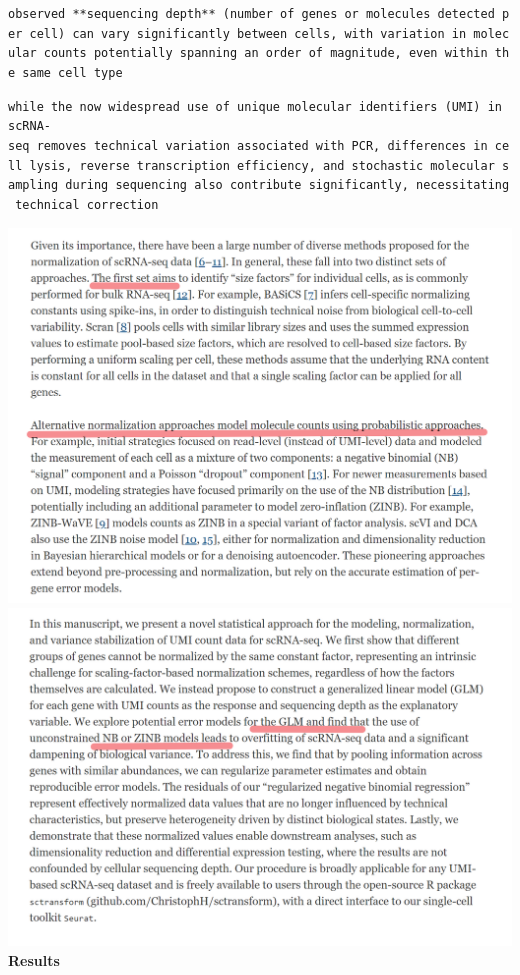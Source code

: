 \documentclass[
]{book}
\begin{document}
\texttt{observed\ **sequencing\ depth**\ (number\ of\ genes\ or\ molecules\ detected\ per\ cell)\ can\ vary\ significantly\ between\ cells,\ with\ variation\ in\ molecular\ counts\ potentially\ spanning\ an\ order\ of\ magnitude,\ even\ within\ the\ same\ cell\ type}

\texttt{while\ the\ now\ widespread\ use\ of\ unique\ molecular\ identifiers\ (UMI)\ in\ scRNA-seq\ removes\ technical\ variation\ associated\ with\ PCR,\ differences\ in\ cell\ lysis,\ reverse\ transcription\ efficiency,\ and\ stochastic\ molecular\ sampling\ during\ sequencing\ also\ contribute\ significantly,\ necessitating\ technical\ correction}

\includegraphics{./figs/RNAseqCounts/background.png}
\includegraphics{./figs/RNAseqCounts/sctrans_intro.png}
\textbf{Results}
\end{document}
